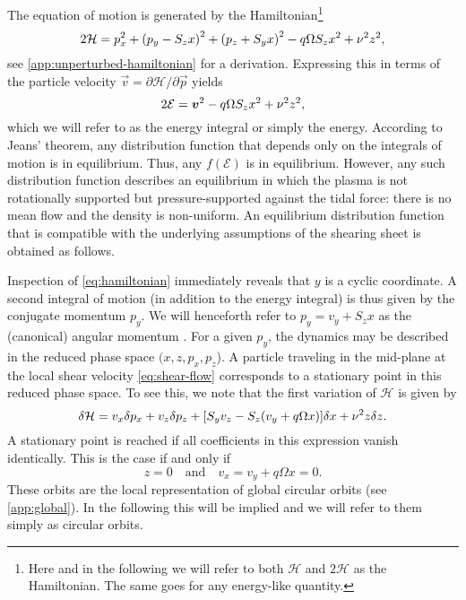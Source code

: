 \documentclass[aps,pre,notitlepage,amsmath,amssymb,amsfonts,nobibnotes,nofootinbib]{revtex4-1}
\begin{document}
The equation of motion  is generated by the
Hamiltonian\footnote{Here and in the following we will refer to both
  $\mathcal{H}$ and $2\mathcal{H}$ as the Hamiltonian. The same goes for any
  energy-like quantity.}
\begin{equation}
  \label{eq:hamiltonian}
  2\mathcal{H} = p_x^2 + {(p_y - S_z x)}^2 + {(p_z + S_y x)}^2
  - q\Omega S_z x^2 + \vfreq^2 z^2,
\end{equation}
see \cref{app:unperturbed-hamiltonian} for a derivation. Expressing this in
terms of the particle velocity $\vec{v}=\partial\mathcal{H}/\partial\vec{p}$
yields
\begin{equation}
  \label{eq:energy-integral}
  2\mathcal{E} = \vec{v}^2 - q\Omega S_z x^2 + \vfreq^2 z^2,
\end{equation}
which we will refer to as the energy integral or simply the energy. According
to Jeans' theorem, any distribution function that depends only on the
integrals of motion is in equilibrium. Thus, any $f(\mathcal{E})$ is in
equilibrium. However, any such distribution function describes an equilibrium
in which the plasma is not rotationally supported but pressure-supported
against the tidal force: there is no mean flow and the density is non-uniform.
An equilibrium distribution function that is compatible with the underlying
assumptions of the shearing sheet is obtained as follows.

Inspection of \cref{eq:hamiltonian} immediately reveals that $y$ is a cyclic
coordinate. A second integral of motion (in addition to the energy integral)
is thus given by the conjugate momentum $p_y$. We will henceforth refer to
$p_y=v_y+S_z{}x$ as the (canonical) angular momentum
\citep[cf.][]{Wisdom1988}. For a given $p_y$, the dynamics may be described in
the reduced phase space $(x,z,p_x,p_z$). A particle traveling in the mid-plane
at the local shear velocity \cref{eq:shear-flow} corresponds to a stationary
point in this reduced phase space. To see this, we note that the first
variation of $\mathcal{H}$ is given by
\begin{equation}
  \delta\mathcal{H} = v_x\delta p_x + v_z\delta p_z
  + [S_y v_z - S_z(v_y + q\Omega x)]\delta x + \nu^2 z\delta z.
\end{equation}
A stationary point is reached if all coefficients in this expression vanish
identically. This is the case if and only if
\begin{equation}
  z = 0 \quad\textrm{and}\quad v_x = v_y + q\Omega x = 0.
\end{equation}
These orbits are the local representation of global circular orbits (see
\cref{app:global}). In the following this will be implied and we will refer to
them simply as circular orbits.
\end{document}
